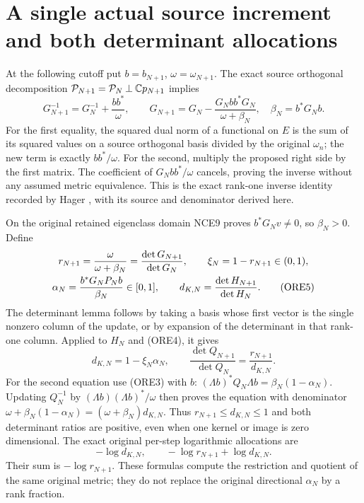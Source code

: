\documentclass[11pt,a4paper]{article}
\begin{document}
\section{A single actual source increment and both determinant allocations}
At the following cutoff put $b=b_{N+1}$, $\omega=\omega_{N+1}$.
The exact source orthogonal decomposition
$\mathcal P_{N+1}=\mathcal P_N\mathbin{\perp}\mathbb C p_{N+1}$ implies
\begin{equation}\tag{ORE4}
 G_{N+1}^{-1}=G_N^{-1}+\frac{bb^*}{\omega},\qquad
 G_{N+1}=G_N-\frac{G_Nbb^*G_N}{\omega+\beta_N},
 \quad\beta_N=b^*G_Nb.
\end{equation}
For the first equality, the squared dual norm of a functional on $E$
is the sum of its squared values on a source orthogonal basis divided
by the original $\omega_n$; the new term is exactly $bb^*/\omega$.
For the second, multiply the proposed right side by the first matrix.
The coefficient of $G_Nbb^*/\omega$ cancels, proving the inverse
without any assumed metric equivalence. This is the exact rank-one
inverse identity recorded by Hager \cite[p.~221, equation (2)]{a04ore:Hager},
with its source and denominator derived here.

On the original retained eigenclass domain NCE9 proves
$b^*G_Nv\ne0$, so $\beta_N>0$. Define
\begin{gather}
 r_{N+1}=\frac{\omega}{\omega+\beta_N}
        =\frac{\det G_{N+1}}{\det G_N},\qquad
 \xi_N=1-r_{N+1}\in(0,1),\notag\\
 \alpha_N=\frac{b^*G_NP_Nb}{\beta_N}\in[0,1],\qquad
 d_{K,N}=\frac{\det H_{N+1}}{\det H_N}.                \tag{ORE5}
\end{gather}
The determinant lemma follows by taking a basis whose first vector is
the single nonzero column of the update, or by expansion of the
determinant in that rank-one column. Applied to $H_N$ and (ORE4), it gives
\begin{equation}\tag{ORE6}
 \boxed{d_{K,N}=1-\xi_N\alpha_N,\qquad
 \frac{\det Q_{N+1}}{\det Q_N}=
       \frac{r_{N+1}}{d_{K,N}}.}
\end{equation}
For the second equation use (ORE3) with $b$:
$(\Lambda b)^*Q_N\Lambda b=\beta_N(1-\alpha_N)$.
Updating $Q_N^{-1}$ by $(\Lambda b)(\Lambda b)^*/\omega$
then proves the equation with denominator
$\omega+\beta_N(1-\alpha_N)=(\omega+\beta_N)d_{K,N}$.
Thus $r_{N+1}\le d_{K,N}\le1$ and both determinant ratios are
positive, even when one kernel or image is zero dimensional.
The exact original per-step logarithmic allocations are
\begin{equation}\tag{ORE7}
 -\log d_{K,N},\qquad
 -\log r_{N+1}+\log d_{K,N}.
\end{equation}
Their sum is $-\log r_{N+1}$. These formulas compute the
restriction and quotient of the same original metric; they do not
replace the original directional $\alpha_N$ by a rank fraction.
\end{document}
